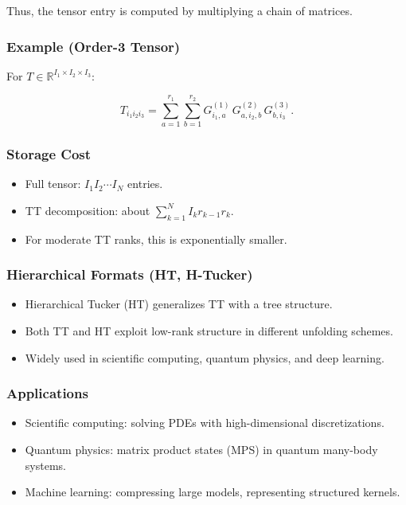 \documentclass[
  letterpaper,
  DIV=11,
  numbers=noendperiod]{scrreprt}
\providecommand{\tightlist}{%
  \setlength{\itemsep}{0pt}\setlength{\parskip}{0pt}}
\begin{document}
Thus, the tensor entry is computed by multiplying a chain of matrices.

\subsubsection{Example (Order-3 Tensor)}\label{example-order-3-tensor}

For \(T \in \mathbb{R}^{I_1 \times I_2 \times I_3}\):

\[
T_{i_1 i_2 i_3} = \sum_{a=1}^{r_1}\sum_{b=1}^{r_2} G^{(1)}_{i_1, a} \, G^{(2)}_{a, i_2, b} \, G^{(3)}_{b, i_3}.
\]

\subsubsection{Storage Cost}\label{storage-cost}

\begin{itemize}
\tightlist
\item
  Full tensor: \(I_1 I_2 \cdots I_N\) entries.
\item
  TT decomposition: about \(\sum_{k=1}^N I_k r_{k-1} r_k\).
\item
  For moderate TT ranks, this is exponentially smaller.
\end{itemize}

\subsubsection{Hierarchical Formats (HT,
H-Tucker)}\label{hierarchical-formats-ht-h-tucker}

\begin{itemize}
\tightlist
\item
  Hierarchical Tucker (HT) generalizes TT with a tree structure.
\item
  Both TT and HT exploit low-rank structure in different unfolding
  schemes.
\item
  Widely used in scientific computing, quantum physics, and deep
  learning.
\end{itemize}

\subsubsection{Applications}\label{applications-4}

\begin{itemize}
\tightlist
\item
  Scientific computing: solving PDEs with high-dimensional
  discretizations.
\item
  Quantum physics: matrix product states (MPS) in quantum many-body
  systems.
\item
  Machine learning: compressing large models, representing structured
  kernels.
\end{itemize}
\end{document}
